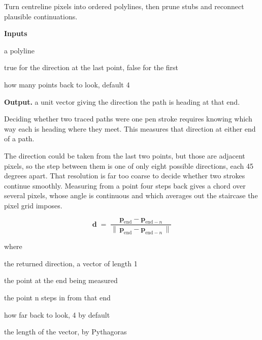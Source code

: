 Turn centreline pixels into ordered polylines, then prune stubs and reconnect plausible continuations.




\noindent\textbf{Inputs}
\begin{description}[leftmargin=2.2em,style=nextline,font=\normalfont\ttfamily]\setlength\itemsep{1pt}
  \item[{pts}] \normalfont a polyline
  \item[{fromEnd}] \normalfont true for the direction at the last point, false for the first
  \item[{n}] \normalfont how many points back to look, default 4
\end{description}

\noindent\textbf{Output.} a unit vector giving the direction the path is heading at that end.


Deciding whether two traced paths were one pen stroke requires knowing which way each is heading where they meet. This measures that direction at either end of a path.


The direction could be taken from the last two points, but those are adjacent pixels, so the step between them is one of only eight possible directions, each 45 degrees apart. That resolution is far too coarse to decide whether two strokes continue smoothly. Measuring from a point four steps back gives a chord over several pixels, whose angle is continuous and which averages out the staircase the pixel grid imposes.


\begin{equation}
\mathbf{d} \;=\; \frac{\mathbf{p}_{\mathrm{end}} - \mathbf{p}_{\mathrm{end}-n}}{\big\|\,\mathbf{p}_{\mathrm{end}} - \mathbf{p}_{\mathrm{end}-n}\,\big\|}
\end{equation}

\noindent where
\begin{description}[leftmargin=2.4em,style=nextline,font=\normalfont\ttfamily]\setlength\itemsep{1pt}
  \item[{$\mathbf{d}$}] \normalfont the returned direction, a vector of length 1
  \item[{$\mathbf{p}_{\mathrm{end}}$}] \normalfont the point at the end being measured
  \item[{$\mathbf{p}_{\mathrm{end}-n}$}] \normalfont the point n steps in from that end
  \item[{$n$}] \normalfont how far back to look, 4 by default
  \item[{$\|\cdot\|$}] \normalfont the length of the vector, by Pythagoras
\end{description}

